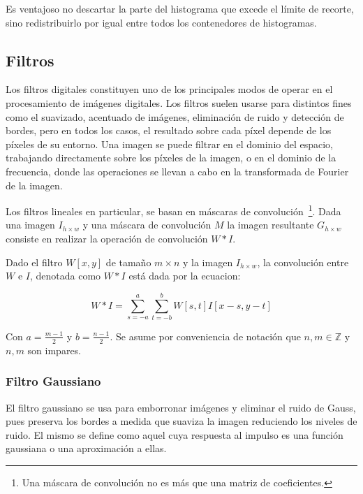 Es ventajoso no descartar la parte del histograma que excede el límite de recorte, sino redistribuirlo por igual entre todos los contenedores de histogramas.


\subsection{Filtros}

Los filtros digitales constituyen uno de los principales modos de operar en el procesamiento de imágenes digitales. Los filtros suelen usarse para distintos fines como el suavizado, acentuado de imágenes, eliminación de ruido y detección de bordes, pero en todos los casos, el resultado sobre cada píxel depende de los píxeles de su entorno. Una imagen se puede filtrar en el dominio del espacio, trabajando directamente sobre los píxeles de la imagen, o en el dominio de la frecuencia, donde las operaciones se llevan a cabo en la transformada de Fourier de la imagen.

Los filtros lineales en particular, se basan en máscaras de convolución~\footnote{Una máscara de convolución no es más que una matriz de coeficientes.}. Dada una imagen $I_{h \times w}$ y una máscara de convolución $M$ la imagen resultante $G_{h \times w}$ consiste en realizar la operación de convolución $W * I$.

\begin{definition}
	Dado el filtro $W[x, y]$ de tamaño $m \times n$ y la imagen $I_{h \times w}$, la convolución entre $W$ e $I$, denotada como $W * I$ está dada por la ecuacion:
	
	\begin{equation}
		W * I = \sum_{s = -a}^a\sum_{t = -b}^b W[s,t] I[x - s, y - t]
	\end{equation}

	Con $a = \frac{m -1}{2}$ y $b = \frac{n -1}{2}$. Se asume por conveniencia de notación que $n, m \in \mathbb{Z}$ y $n, m$ son impares.
\end{definition}



\subsubsection{Filtro Gaussiano}

El filtro gaussiano se usa para emborronar imágenes y eliminar el ruido de Gauss, pues preserva los bordes a medida que suaviza la imagen reduciendo los niveles de ruido. El mismo se define como aquel cuya respuesta al impulso es una función gaussiana o una aproximación a ellas.

